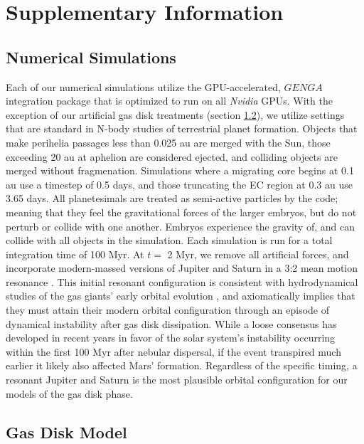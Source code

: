 \documentclass[trackchanges,twocolumn]{aastex}
\begin{document}
\appendix
\section{Supplementary Information}
\subsection{Numerical Simulations}
\label{sect:meth_sims}

Each of our numerical simulations utilize the GPU-accelerated, $GENGA$ integration package \citep{genga} that is optimized to run on all \textit{Nvidia} GPUs.  With the exception of our artificial gas disk treatments (section \ref{sect:meth_gas}), we utilize settings that are standard in N-body studies of terrestrial planet formation.  Objects that make perihelia passages less than 0.025 au are merged with the Sun, those exceeding 20 au at aphelion are considered ejected, and colliding objects are merged without fragmenation.  Simulations where a migrating core begins at 0.1 au use a timestep of 0.5 days, and those truncating the EC region at 0.3 au use 3.65 days.  All planetesimals are treated as semi-active particles by the code; meaning that they feel the gravitational forces of the larger embryos, but do not perturb or collide with one another.  Embryos experience the gravity of, and can collide with all objects in the simulation.  Each simulation is run for a total integration time of 100 Myr.  At $t=$ 2 Myr, we remove all artificial forces, and incorporate modern-massed versions of Jupiter and Saturn in a 3:2 mean motion resonance \citep[e.g.:][]{nesvorny12}.  This initial resonant configuration is consistent with hydrodynamical studies of the gas giants' early orbital evolution \citep[e.g.:][]{morbidelli07}, and axiomatically implies that they must attain their modern orbital configuration through an episode of dynamical instability after gas disk dissipation.  While a loose consensus has developed in recent years in favor of the solar system's instability occurring within the first 100 Myr after nebular dispersal, if the event transpired much earlier \citep[$t\lesssim$ 10 Myr:][]{clement18} it likely also affected Mars' formation.  Regardless of the specific timing, a resonant Jupiter and Saturn is the most plausible orbital configuration for our models of the gas disk phase.

\subsection{Gas Disk Model}
\label{sect:meth_gas}
\end{document}
